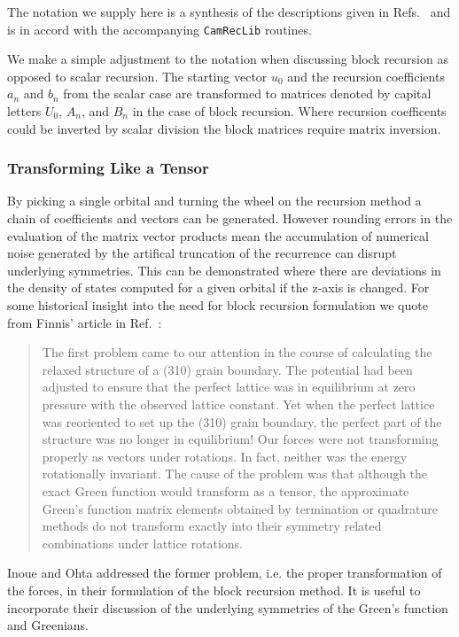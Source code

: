 The notation we supply here is a synthesis of the descriptions 
given in Refs.~\cite{paxton88, nex89} and is in 
accord with the accompanying \texttt{CamRecLib} routines.

We make a simple adjustment to the notation when discussing
block recursion as opposed to scalar recursion.
The starting vector $u_{0}$ and the recursion coefficients
$a_{n}$ and $b_{n}$ from the scalar case are transformed to
matrices denoted by capital letters $U_{0}$, $A_{n}$, and $B_{n}$
in the case of block recursion. Where recursion coefficents could be
inverted by scalar division the block matrices require matrix inversion.

\subsubsection{Transforming Like a Tensor}
By picking a single orbital and turning the wheel on the recursion method a
chain of coefficients and vectors can be generated. However rounding errors in the evaluation
of the matrix vector products mean the accumulation of numerical noise
generated by the artifical truncation of the recurrence
can disrupt underlying symmetries. This can be demonstrated where there are 
deviations in the density of states computed for a given orbital if the z-axis 
is changed. For some historical insight into the need for block recursion formulation
we quote from Finnis' article in Ref.~\cite{andersen89}:

\begin{quote}
The first problem came to our attention in the course of 
calculating the relaxed structure of a (310) grain boundary.
The potential had been adjusted to ensure that the perfect lattice
was in equilibrium at zero pressure with the observed lattice constant. Yet
when the perfect lattice was reoriented to set up the (310) grain boundary, the 
perfect part of the structure was no longer in equilibrium! Our forces were not transforming
properly as vectors under rotations. In fact, neither was the energy rotationally invariant.
The cause of the problem was that although the exact Green function would transform as a tensor,
the approximate Green's function matrix elements obtained by termination or quadrature
methods do not transform exactly into their symmetry related combinations under lattice 
rotations.
\end{quote}

Inoue and Ohta addressed the former problem, i.e. the proper transformation of the forces,
in their formulation of the block recursion method\cite{inoue87}. 
It is useful to incorporate their discussion of the underlying 
symmetries of the Green's function and Greenians.

